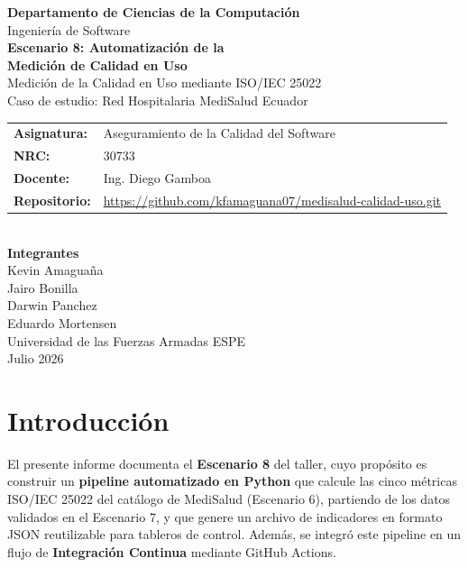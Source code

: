\documentclass[12pt,a4paper]{article}
\begin{document}
\begin{titlepage}
\centering
{\Large \textbf{Departamento de Ciencias de la Computaci\'on}}\\[0.3cm]
{\large Ingenier\'ia de Software}\\[1.5cm]

{\LARGE \textbf{Escenario 8: Automatizaci\'on de la\\Medici\'on de Calidad en Uso}}\\[0.5cm]
{\large Medici\'on de la Calidad en Uso mediante ISO/IEC 25022}\\[0.3cm]
{\large Caso de estudio: Red Hospitalaria MediSalud Ecuador}\\[2cm]

\begin{tabular}{ll}
\textbf{Asignatura:} & Aseguramiento de la Calidad del Software \\
\textbf{NRC:}        & 30733 \\
\textbf{Docente:}    & Ing. Diego Gamboa \\
\textbf{Repositorio:} & \url{https://github.com/kfamaguana07/medisalud-calidad-uso.git} \\
\end{tabular}\\[1.5cm]

\textbf{Integrantes}\\[0.3cm]
Kevin Amagua\~na \\
Jairo Bonilla \\
Darwin Panchez \\
Eduardo Mortensen \\[2cm]

{\large Universidad de las Fuerzas Armadas ESPE}\\[0.3cm]
{\large Julio 2026}
\end{titlepage}

\tableofcontents
\newpage

\section{Introducci\'on}
El presente informe documenta el \textbf{Escenario 8} del taller, cuyo prop\'osito es construir un \textbf{pipeline automatizado en Python} que calcule las cinco m\'etricas ISO/IEC 25022 del cat\'alogo de MediSalud (Escenario 6), partiendo de los datos validados en el Escenario 7, y que genere un archivo de indicadores en formato JSON reutilizable para tableros de control. Adem\'as, se integr\'o este pipeline en un flujo de \textbf{Integraci\'on Continua} mediante GitHub Actions.
\end{document}
